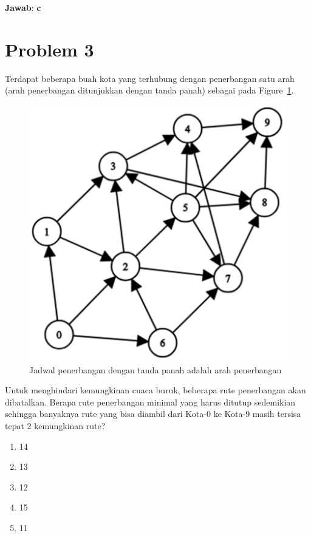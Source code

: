 \documentclass{article}
\theoremstyle{plain}
\begin{document}
\bigskip
\noindent \textbf{Jawab}: \textbf{c}

\newpage
\section*{Problem 3}
Terdapat beberapa buah kota yang terhubung dengan penerbangan satu arah (arah penerbangan ditunjukkan dengan tanda panah) sebagai pada Figure~\ref{fig:jadwal-penerbangan-soal-3}.

\begin{figure}[!ht]
\centering
\includegraphics[scale=.225]{images/problem-2-dan-3}
\caption{Jadwal penerbangan dengan tanda panah adalah arah penerbangan}
\label{fig:jadwal-penerbangan-soal-3} 
\end{figure}

\noindent Untuk menghindari kemungkinan cuaca buruk, beberapa rute penerbangan akan dibatalkan. Berapa rute penerbangan minimal yang harus ditutup sedemikian sehingga banyaknya rute yang bisa diambil dari Kota-0 ke Kota-9 masih tersisa tepat 2 kemungkinan rute?
	\begin{enumerate}[-,topsep=0pt, nosep,label=\alph*. ]
		\item 14
		\item 13
		\item 12
		\item 15
		\item 11
	\end{enumerate}
\end{document}
